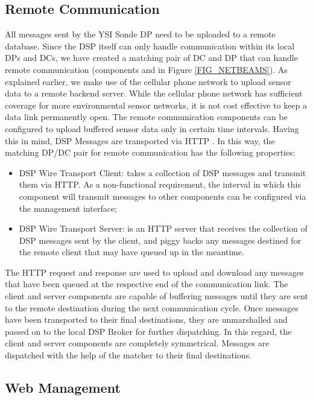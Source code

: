 \documentclass[conference]{IEEEtran}
\begin{document}
\subsection{Remote Communication}

All messages sent by the YSI Sonde DP need to be uploaded to a remote
database. Since the DSP itself can only handle communication within
its local DPs and DCs, we have created a matching pair of DC and DP
that can handle remote communication (components  and  in Figure
\ref{FIG_NETBEAMS}). As explained earlier, we make use of the cellular
phone network to upload sensor data to a remote backend server. While
the cellular phone network has sufficient coverage for more
environmental sensor networks, it is not cost effective to keep a data
link permanently open. The remote communication components can be
configured to upload buffered sensor data only in certain time
intervals. Having this in mind, DSP Messages are transported via HTTP
\cite{RFC2068}. In this way, the matching DP/DC pair for remote communication
has the following properties:

\begin{itemize}
\item DSP Wire Transport Client: takes a collection of DSP messages
  and transmit them via HTTP. As a non-functional requirement, the
  interval in which this component will transmit messages to other
  components can be configured via the management interface;
\item DSP Wire Transport Server: is an HTTP server that receives the
  collection of DSP messages sent by the client, and piggy backs any
  messages destined for the remote client that may have queued up in
  the meantime.
\end{itemize}

The HTTP request and response are used to upload and download any
messages that have been queued at the respective end of the
communication link. The client and server components are capable of
buffering messages until they are sent to the remote destination
during the next communication cycle. Once messages have been
transported to their final destinations, they are unmarshalled and
passed on to the local DSP Broker for further dispatching. In this
regard, the client and server components are completely symmetrical. Messages
are dispatched with the help of the matcher to their final destinations.


\subsection{Web Management}
\end{document}
